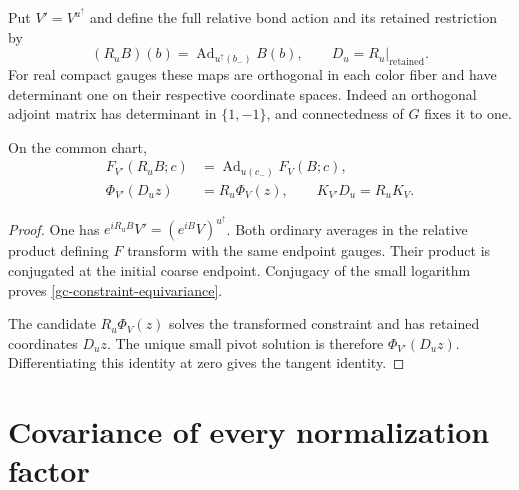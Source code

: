 Put $V'=V^{u^\uparrow}$ and define the full relative bond action
and its retained restriction by
\begin{equation}\label{gc-adjoint-maps}
 (R_u B)(b)=\operatorname{Ad}_{u^\uparrow(b_-)}B(b),
 \qquad D_u=R_u|_{\mathrm{retained}}.
\end{equation}
For real compact gauges these maps are orthogonal in each color
fiber and have determinant one on their respective coordinate
spaces. Indeed an orthogonal adjoint matrix has determinant in
$\{1,-1\}$, and connectedness of $G$ fixes it to one.

\begin{lemma}\label{gc-chart-lemma}
On the common chart,
\begin{align}
 F_{V'}(R_uB;c)&=\operatorname{Ad}_{u(c_-)}F_V(B;c),       \label{gc-constraint-equivariance}\\
 \Phi_{V'}(D_uz)&=R_u\Phi_V(z),\qquad
 K_{V'}D_u=R_uK_V.                                      \label{gc-chart-equivariance}
\end{align}
\end{lemma}
\begin{proof}
One has $e^{iR_uB}V'=(e^{iB}V)^{u^\uparrow}$. Both ordinary
averages in the relative product defining $F$ transform with
the same endpoint gauges. Their product is conjugated at the
initial coarse endpoint. Conjugacy of the small logarithm proves
\eqref{gc-constraint-equivariance}.

The candidate $R_u\Phi_V(z)$ solves the transformed constraint
and has retained coordinates $D_uz$. The unique small pivot
solution is therefore $\Phi_{V'}(D_uz)$. Differentiating this
identity at zero gives the tangent identity.
\end{proof}

\section{Covariance of every normalization factor}
\label{gc-factors}


